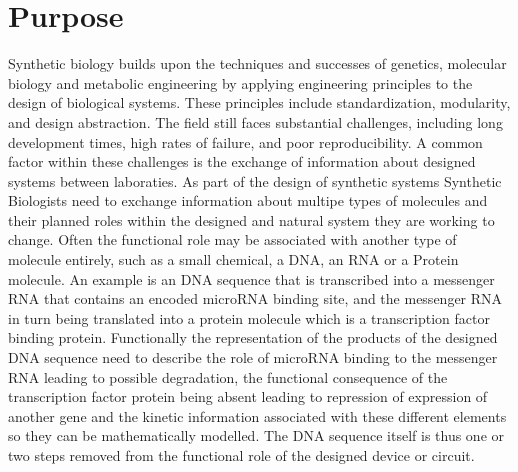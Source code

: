 \section{Purpose}



Synthetic biology builds upon the techniques and successes of genetics, molecular biology and metabolic engineering by applying engineering principles to the design of biological systems. These principles include standardization, modularity, and design abstraction. The field still faces substantial challenges, including long development times, high rates of failure, and poor reproducibility. A common factor within these challenges is the exchange of information about designed systems between laboraties. As part of the design of synthetic systems Synthetic Biologists need to exchange information about multipe types of molecules and their planned roles within the designed and natural system they are working to change. Often the functional role may be associated with another type of molecule entirely, such as a small chemical, a DNA, an RNA or a Protein molecule. An example is an DNA sequence that is transcribed into a messenger RNA that contains an encoded microRNA binding site, and the messenger RNA in turn being translated into a protein molecule which is a transcription factor binding protein. Functionally the representation of the products of the designed DNA sequence need to describe the role of microRNA binding to the messenger RNA leading to possible  degradation, the functional consequence of the transcription factor protein being absent leading to repression of expression of another gene and the kinetic information associated with these different elements so they can be mathematically modelled. The DNA sequence itself is thus one or two steps removed from the functional role of the designed device or circuit. 

